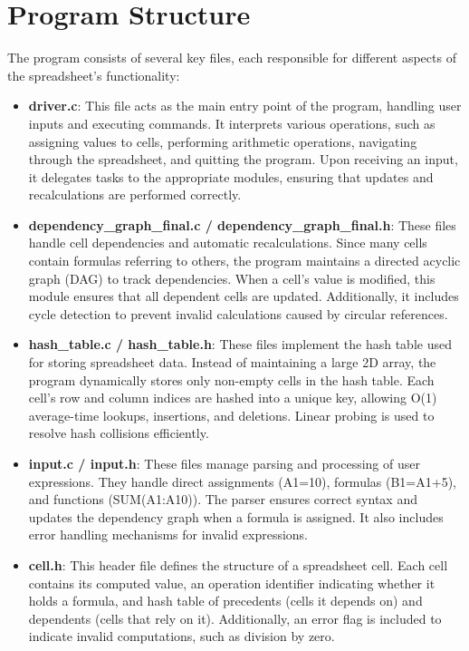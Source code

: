 \documentclass[a4paper,12pt]{article}
\begin{document}
\section{Program Structure}
The program consists of several key files, each responsible for different aspects of the spreadsheet's functionality:

\begin{itemize}
    \item \textbf{driver.c}: This file acts as the main entry point of the program, handling user inputs and executing commands. It interprets various operations, such as assigning values to cells, performing arithmetic operations, navigating through the spreadsheet, and quitting the program. Upon receiving an input, it delegates tasks to the appropriate modules, ensuring that updates and recalculations are performed correctly.
    
    \item \textbf{dependency\_graph\_final.c / dependency\_graph\_final.h}: These files handle cell dependencies and automatic recalculations. Since many cells contain formulas referring to others, the program maintains a directed acyclic graph (DAG) to track dependencies. When a cell's value is modified, this module ensures that all dependent cells are updated. Additionally, it includes cycle detection to prevent invalid calculations caused by circular references.

    \item \textbf{hash\_table.c / hash\_table.h}: These files implement the hash table used for storing spreadsheet data. Instead of maintaining a large 2D array, the program dynamically stores only non-empty cells in the hash table. Each cell's row and column indices are hashed into a unique key, allowing O(1) average-time lookups, insertions, and deletions. Linear probing is used to resolve hash collisions efficiently.

    \item \textbf{input.c / input.h}: These files manage parsing and processing of user expressions. They handle direct assignments (A1=10), formulas (B1=A1+5), and functions (SUM(A1:A10)). The parser ensures correct syntax and updates the dependency graph when a formula is assigned. It also includes error handling mechanisms for invalid expressions.

    \item \textbf{cell.h}: This header file defines the structure of a spreadsheet cell. Each cell contains its computed value, an operation identifier indicating whether it holds a formula, and hash table of precedents (cells it depends on) and dependents (cells that rely on it). Additionally, an error flag is included to indicate invalid computations, such as division by zero.
\end{itemize}
\end{document}
